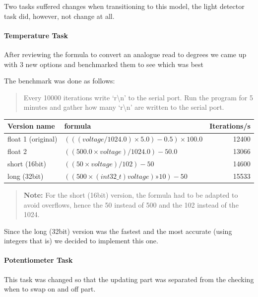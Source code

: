 \documentclass[10pt]{article}
\begin{document}
Two tasks suffered changes when transitioning to this model, the light detector
task did, however, not change at all.

\paragraph{Temperature Task}\label{p:temperature}

After reviewing the formula to convert an analogue read to degrees we came up
with 3 new options and benchmarked them to see which was best

The benchmark was done as follows:
\begin{quote}
    Every 10000 iterations write `r\textbackslash{}n' to the serial port. Run
    the program for 5 minutes and gather how many `r\textbackslash{}n' are
    written to the serial port.
\end{quote}

\begin{tabular}{llr}

    Version name  & formula                                           & Iterations/s
    \\\toprule
    float 1 (original) & $(((voltage / 1024.0) \times 5.0) - 0.5) \times 100.0$ & 12400\\
    float 2       & $((500.0 \times voltage) / 1024.0) - 50.0$             & 13066  \\
    short (16bit) & $((50 \times voltage) / 102) - 50$                     & 14600  \\
    long  (32bit) & $((500 \times (int32\_t) voltage) » 10) - 50$          & 15533 \\
\bottomrule

\end{tabular}

\begin{quote}
    \textbf{Note:} For the short (16bit) version, the formula had to be adapted
    to avoid overflows, hence the 50 instead of 500 and the 102 instead of the
    1024.
\end{quote}

Since the long (32bit) version was the fastest and the most accurate (using
integers that is) we decided to implement this one.


\paragraph{Potentiometer Task}

This task was changed so that the updating part was separated from the checking
when to swap on and off part.
\end{document}
